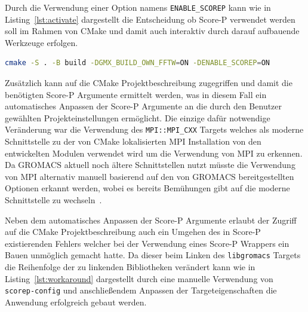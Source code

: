 \documentclass[german,proseminar,hyperref,utf8,lof]{zihpub}
\begin{document}
    Durch die Verwendung einer Option namens \texttt{ENABLE\_SCOREP} kann wie in Listing~\ref{lst:activate}
    dargestellt die Entscheidung ob Score-P verwendet werden soll im Rahmen von CMake und damit auch
    interaktiv durch darauf aufbauende Werkzeuge erfolgen.

    \begin{lstlisting}[caption=Aktivieren von Score-P bei GROMACS, language=bash, gobble=8, label=lst:activate]
        cmake -S . -B build -DGMX_BUILD_OWN_FFTW=ON -DENABLE_SCOREP=ON
    \end{lstlisting}

    Zusätzlich kann auf die CMake Projektbeschreibung zugegriffen und damit die benötigten Score-P Argumente
    ermittelt werden, was in diesem Fall ein automatisches Anpassen der Score-P Argumente an die
    durch den Benutzer gewählten Projekteinstellungen ermöglicht.
    Die einzige dafür notwendige Veränderung war die Verwendung des \texttt{MPI::MPI\_CXX} Targets welches
    als moderne Schnittstelle zu der von CMake lokalisierten MPI Installation von den entwickelten
    Modulen verwendet wird um die Verwendung von MPI zu erkennen.
    Da GROMACS aktuell noch ältere Schnittstellen nutzt müsste die Verwendung von MPI alternativ
    manuell basierend auf den von GROMACS bereitgestellten Optionen erkannt werden, wobei es bereits
    Bemühungen gibt auf die moderne Schnittstelle zu wechseln~.

    Neben dem automatisches Anpassen der Score-P Argumente erlaubt der Zugriff auf die CMake
    Projektbeschreibung auch ein Umgehen des in Score-P existierenden Fehlers
    welcher bei der Verwendung eines Score-P Wrappers ein Bauen unmöglich gemacht hatte.
    Da dieser beim Linken des \texttt{libgromacs} Targets die Reihenfolge der zu linkenden Bibliotheken
    verändert kann wie in Listing~\ref{lst:workaround} dargestellt durch eine manuelle Verwendung von
    \texttt{scorep-config} und anschlie{\ss}endem Anpassen der Targeteigenschaften die Anwendung erfolgreich
    gebaut werden.
\end{document}
